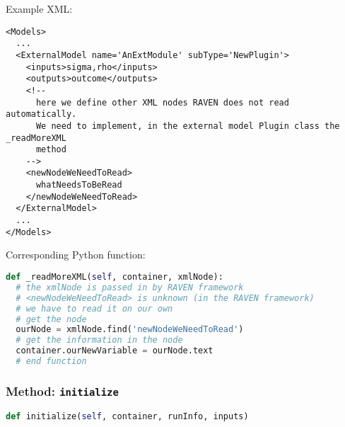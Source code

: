 Example XML:
\begin{lstlisting}[style=XML,morekeywords={subType,ModuleToLoad}]
<Models>
  ...
  <ExternalModel name='AnExtModule' subType='NewPlugin'>
    <inputs>sigma,rho</inputs>
    <outputs>outcome</outputs>
    <!--
      here we define other XML nodes RAVEN does not read automatically.
      We need to implement, in the external model Plugin class the _readMoreXML
      method
    -->
    <newNodeWeNeedToRead>
      whatNeedsToBeRead
    </newNodeWeNeedToRead>
  </ExternalModel>
  ...
</Models>
\end{lstlisting}

Corresponding Python function:
\begin{lstlisting}[language=python]
def _readMoreXML(self, container, xmlNode):
  # the xmlNode is passed in by RAVEN framework
  # <newNodeWeNeedToRead> is unknown (in the RAVEN framework)
  # we have to read it on our own
  # get the node
  ourNode = xmlNode.find('newNodeWeNeedToRead')
  # get the information in the node
  container.ourNewVariable = ourNode.text
  # end function
\end{lstlisting}

\subsubsection{Method: \texttt{initialize}}
\label{subsubsec:externalInitializeExternalModelPlugin}
\begin{lstlisting}[language=python]
def initialize(self, container, runInfo, inputs)
\end{lstlisting}

